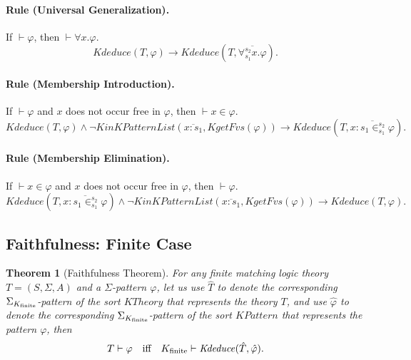 \documentclass[UTF8,11pt]{article}
\newcounter{thmcounter}
\theoremstyle{plain}
\newtheorem{theorem}    [thmcounter]{Theorem}
\theoremstyle{definition}
\theoremstyle{remark}
\newcommand{\cln}{{:}}
\newcommand{\KinKPatternList}{\mathit{KinKPatternList}}
\newcommand{\KPattern}{\mathit{KPattern}}
\newcommand{\KgetFvs}{\mathit{KgetFvs}}
\newcommand{\KTheory}{\mathit{KTheory}}
\newcommand{\Kdeduce}{\mathit{Kdeduce}}
\begin{document}
\paragraph{Rule (Universal Generalization).}
If $\vdash \varphi$, then $\vdash \forall x . \varphi$.
\begin{equation*}
\Kdeduce(T, \varphi) \to \Kdeduce(T, \overline{\forall_{s_1}^{s_2} x . \varphi}).
\end{equation*}

\paragraph{Rule (Membership Introduction).}
If $\vdash \varphi$ and $x$ does not occur free in $\varphi$, then $\vdash x \in \varphi$.
\begin{equation*}
\Kdeduce(T, \varphi) \wedge \neg \KinKPatternList(\overline{x \cln s_1}, \KgetFvs(\varphi)) \to \Kdeduce(T, \overline{x \cln s_1 \in_{s_1}^{s_2} \varphi}).
\end{equation*}

\paragraph{Rule (Membership Elimination).}
If $\vdash x \in \varphi$ and $x$ does not occur free in $\varphi$, then $\vdash \varphi$.
\begin{equation*}
\Kdeduce(T, \overline{x \cln s_1 \in_{s_1}^{s_2} \varphi}) \wedge\neg \KinKPatternList(\overline{x \cln s_1}, \KgetFvs(\varphi)) \to \Kdeduce(T, \varphi).
\end{equation*}

\subsection{Faithfulness: Finite Case}

\begin{theorem}[Faithfulness Theorem]\label{thm:faithfulness-finite}
	For any finite matching logic theory $T = (S, \Sigma, A)$ and a $\Sigma$-pattern $\varphi$, let us use $\hat{T}$ to denote the corresponding $\Sigma_{K_\text{finite}}$-pattern of the sort $\KTheory$ that represents the theory $T$, and use $\hat{\varphi}$ to denote the corresponding $\Sigma_{K_\text{finite}}$-pattern of the sort $\KPattern$ that represents the pattern $\varphi$, then
	$$T \vdash \varphi \quad \text{iff} \quad \Kfinite \vdash \Kdeduce(\hat{T}, \hat{\varphi}).$$
\end{theorem}
\end{document}
